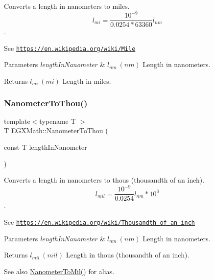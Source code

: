 Converts a length in nanometers to miles. \[ l_{mi}=\frac{10^{-9}}{0.0254 * 63360} l_{nm} \]. 

See \href{https://en.wikipedia.org/wiki/Mile}{\tt https\+://en.\+wikipedia.\+org/wiki/\+Mile} 
\begin{DoxyParams}{Parameters}
{\em length\+In\+Nanometer} & $ l_{nm}\ (nm)$ Length in nanometers. \\
\hline
\end{DoxyParams}
\begin{DoxyReturn}{Returns}
$ l_{mi}\ (mi)$ Length in miles. 
\end{DoxyReturn}
\mbox{\label{group___e_g_x_math-_conversions-_length_conversions-_s_i-_nanometer-_imperial_ga4c714a8d3ab333da358dafe181ebdcc4}} 
\subsubsection{\texorpdfstring{Nanometer\+To\+Thou()}{NanometerToThou()}}
{\footnotesize\ttfamily template$<$typename T $>$ \\
T E\+G\+X\+Math\+::\+Nanometer\+To\+Thou (\begin{DoxyParamCaption}\item[{const T}]{length\+In\+Nanometer }\end{DoxyParamCaption})}



Converts a length in nanometers to thous (thousandth of an inch). \[ l_{mil}= \frac{10^{-9}}{0.0254} l_{nm} * 10^{3} \]. 

See \href{https://en.wikipedia.org/wiki/Thousandth_of_an_inch}{\tt https\+://en.\+wikipedia.\+org/wiki/\+Thousandth\+\_\+of\+\_\+an\+\_\+inch} 
\begin{DoxyParams}{Parameters}
{\em length\+In\+Nanometer} & $ l_{nm}\ (nm)$ Length in nanometers. \\
\hline
\end{DoxyParams}
\begin{DoxyReturn}{Returns}
$ l_{mil}\ (mil)$ Length in thous (thousandth of an inch). 
\end{DoxyReturn}
\begin{DoxySeeAlso}{See also}
\mbox{\hyperlink{group___e_g_x_math-_conversions-_length_conversions-_s_i-_nanometer-_imperial_gacfd62a86ae9a5085569840f3b7bbdb3e}{Nanometer\+To\+Mil()}} for alias. 
\end{DoxySeeAlso}
\mbox{\label{group___e_g_x_math-_conversions-_length_conversions-_s_i-_nanometer-_imperial_ga1f2313a0bf1527690778a6dace0db853}} 
